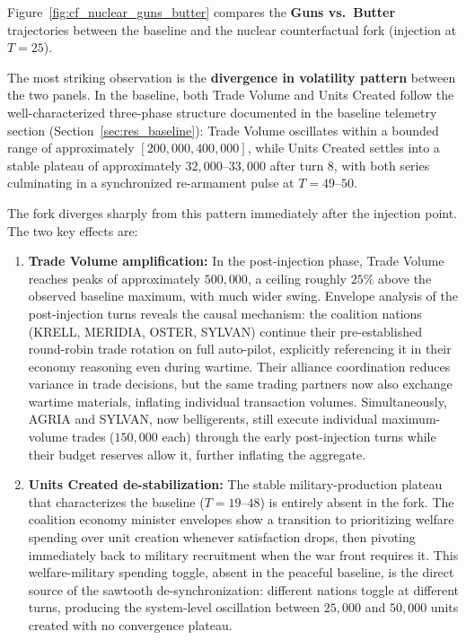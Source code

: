 Figure~\ref{fig:cf_nuclear_guns_butter} compares the \textbf{Guns vs.\ Butter} trajectories between the baseline and the nuclear counterfactual fork (injection at $T=25$).

The most striking observation is the \textbf{divergence in volatility pattern} between the two panels. In the baseline, both Trade Volume and Units Created follow the well-characterized three-phase structure documented in the baseline telemetry section (Section~\ref{sec:res_baseline}): Trade Volume oscillates within a bounded range of approximately $[200{,}000, 400{,}000]$, while Units Created settles into a stable plateau of approximately $32{,}000$--$33{,}000$ after turn 8, with both series culminating in a synchronized re-armament pulse at $T=49$--$50$.

The fork diverges sharply from this pattern immediately after the injection point. The two key effects are:

\begin{enumerate}
    \item \textbf{Trade Volume amplification:} In the post-injection phase, Trade Volume reaches peaks of approximately $500{,}000$, a ceiling roughly $25\%$ above the observed baseline maximum, with much wider swing. Envelope analysis of the post-injection turns reveals the causal mechanism: the coalition nations (KRELL, MERIDIA, OSTER, SYLVAN) continue their pre-established round-robin trade rotation on full auto-pilot, explicitly referencing it in their economy reasoning even during wartime. Their alliance coordination reduces variance in trade decisions, but the same trading partners now also exchange wartime materials, inflating individual transaction volumes. Simultaneously, AGRIA and SYLVAN, now belligerents, still execute individual maximum-volume trades ($150{,}000$ each) through the early post-injection turns while their budget reserves allow it, further inflating the aggregate.
    \item \textbf{Units Created de-stabilization:} The stable military-production plateau that characterizes the baseline ($T=19$--$48$) is entirely absent in the fork. The coalition economy minister envelopes show a transition to prioritizing welfare spending over unit creation whenever satisfaction drops, then pivoting immediately back to military recruitment when the war front requires it. This welfare-military spending toggle, absent in the peaceful baseline, is the direct source of the sawtooth de-synchronization: different nations toggle at different turns, producing the system-level oscillation between $25{,}000$ and $50{,}000$ units created with no convergence plateau.
\end{enumerate}


